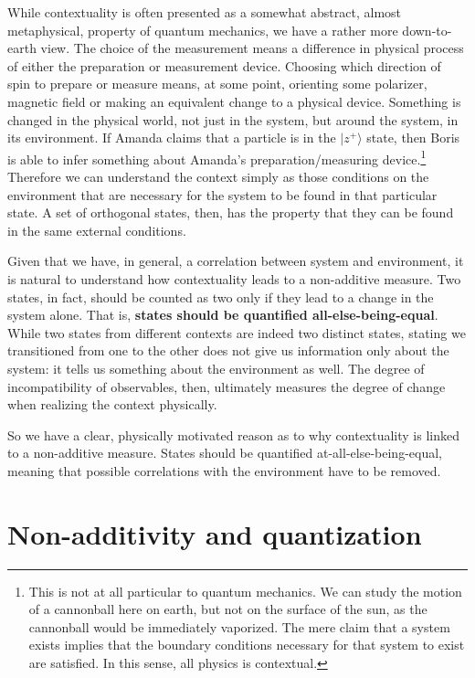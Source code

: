 \documentclass[entropy,article,submit,pdftex,moreauthors]{Definitions/mdpi}
\def\>{\rangle}
\begin{document}
While contextuality is often presented as a somewhat abstract, almost metaphysical, property of quantum mechanics, we have a rather more down-to-earth view. The choice of the measurement means a difference in physical process of either the preparation or measurement device. Choosing which direction of spin to prepare or measure means, at some point, orienting some polarizer, magnetic field or making an equivalent change to a physical device. Something is changed in the physical world, not just in the system, but around the system, in its environment. If Amanda claims that a particle is in the $|z^+\>$ state, then Boris is able to infer something about Amanda's preparation/measuring device.\footnote{This is not at all particular to quantum mechanics. We can study the motion of a cannonball here on earth, but not on the surface of the sun, as the cannonball would be immediately vaporized. The mere claim that a system exists implies that the boundary conditions necessary for that system to exist are satisfied. In this sense, all physics is contextual.} Therefore we can understand the context simply as those conditions on the environment that are necessary for the system to be found in that particular state. A set of orthogonal states, then, has the property that they can be found in the same external conditions.

Given that we have, in general, a correlation between system and environment, it is natural to understand how contextuality leads to a non-additive measure. Two states, in fact, should be counted as two only if they lead to a change in the system alone. That is, \textbf{states should be quantified all-else-being-equal}. While two states from different contexts are indeed two distinct states, stating we transitioned from one to the other does not give us information only about the system: it tells us something about the environment as well. The degree of incompatibility of observables, then, ultimately measures the degree of change when realizing the context physically.

So we have a clear, physically motivated reason as to why contextuality is linked to a non-additive measure. States should be quantified at-all-else-being-equal, meaning that possible correlations with the environment have to be removed.

\section{Non-additivity and quantization}
\end{document}

